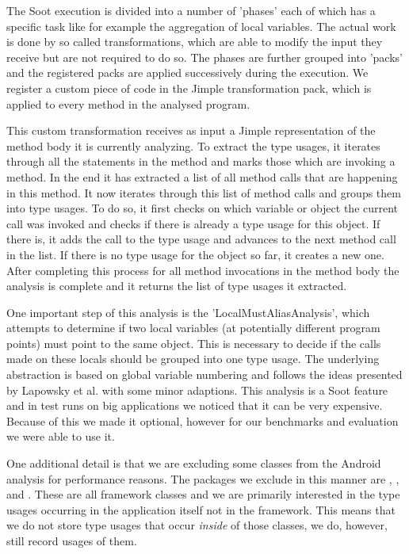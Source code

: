 The Soot execution is divided into a number of 'phases' each of which has a specific task like for example the aggregation of local variables.
The actual work is done by so called transformations, which are able to modify the input they receive but are not required to do so.
The phases are further grouped into 'packs' and the registered packs are applied successively during the execution.
We register a custom piece of code in the Jimple transformation pack, which is applied to every method in the analysed program.

This custom transformation receives as input a Jimple representation of the method body it is currently analyzing.
To extract the type usages, it iterates through all the statements in the method and marks those which are invoking a method.
In the end it has extracted a list of all method calls that are happening in this method.
It now iterates through this list of method calls and groups them into type usages.
To do so, it first checks on which variable or object the current call was invoked and checks if there is already a type usage for this object.
If there is, it adds the call to the type usage and advances to the next method call in the list.
If there is no type usage for the object so far, it creates a new one.
After completing this process for all method invocations in the method body the analysis is complete and it returns the list of type usages it extracted.

One important step of this analysis is the 'LocalMustAliasAnalysis', which attempts to determine if two local variables (at potentially different program points) must point to the same object.
This is necessary to decide if the calls made on these locals should be grouped into one type usage.
The underlying abstraction is based on global variable numbering and follows the ideas presented by Lapowsky et al. \cite{lapkowski1998extended} with some minor adaptions.
This analysis is a Soot feature and in test runs on big applications we noticed that it can be very expensive.
Because of this we made it optional, however for our benchmarks and evaluation we were able to use it.

One additional detail is that we are excluding some classes from the Android analysis for performance reasons.
The packages we exclude in this manner are , ,  and  .
These are all framework classes and we are primarily interested in the type usages occurring in the application itself not in the framework.
This means that we do not store type usages that occur \emph{inside} of those classes, we do, however, still record usages of them.

